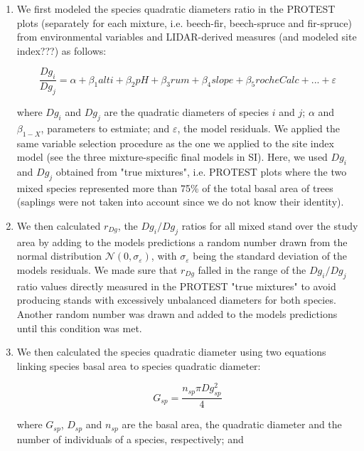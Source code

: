 \documentclass[a4paper]{article}
\begin{document}
\begin{enumerate}

  \item We first modeled the species quadratic diameters ratio in the PROTEST plots (separately for each mixture, i.e. beech-fir, beech-spruce and fir-spruce) from environmental variables and LIDAR-derived measures (and modeled site index???) as follows:

  \begin{equation}\label{DgModel}
    \frac{Dg_i}{Dg_j} = \alpha + \beta_1 alti + \beta_2 pH +\beta_3 rum +\beta_4 slope +\beta_5 rocheCalc+...+\varepsilon
  \end{equation}

  where $Dg_i$ and $Dg_j$ are the quadratic diameters of species $i$ and $j$; $\alpha$ and $\beta_{1-X}$, parameters to estmiate; and $\varepsilon$, the model residuals. We applied the same variable selection procedure as the one we applied to the site index model (see the three mixture-specific final models in SI). Here, we used $Dg_i$ and $Dg_j$ obtained from "true mixtures", i.e. PROTEST plots where the two mixed species represented more than 75\% of the total basal area of trees (saplings were not taken into account since we do not know their identity).

  \item We then calculated $r_{Dg}$, the $Dg_i / Dg_j$ ratios for all mixed stand over the study area by adding to the models predictions a random number drawn from the normal distribution $\mathcal{N} (0, \sigma_\varepsilon)$, with $\sigma_\varepsilon$ being the standard deviation of the models residuals. We made sure that $r_{Dg}$ falled in the range of the $Dg_i / Dg_j$ ratio values directly measured in the PROTEST "true mixtures" to avoid producing stands with excessively unbalanced diameters for both species. Another random number was drawn and added to the models predictions until this condition was met.

  \item We then calculated the species quadratic diameter using two equations linking species basal area to species quadratic diameter:

  \begin{equation}\label{Gsp}
    G_{sp} = \frac{n_{sp}\pi Dg_{sp}^2}{4}
  \end{equation}

  where $G_{sp}$, $D_{sp}$ and $n_{sp}$ are the basal area, the quadratic diameter and the number of individuals of a species, respectively; and


\end{enumerate}
\end{document}
